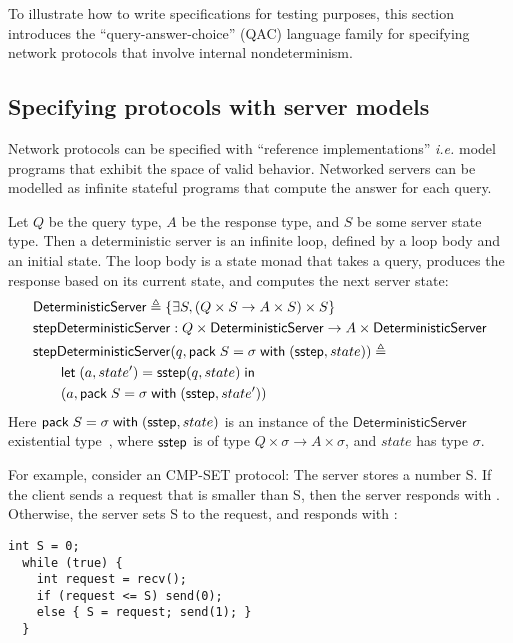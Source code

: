 To illustrate how to write specifications for testing purposes, this section
introduces the ``query-answer-choice'' (QAC) language family for specifying
network protocols that involve internal nondeterminism.

\subsection{Specifying protocols with server models}
Network protocols can be specified with ``reference implementations'' {\it i.e.}
model programs that exhibit the space of valid behavior.  Networked servers can
be modelled as infinite stateful programs that compute the answer for each
query.
\begin{definition}
Let $Q$ be the query type, $A$ be the response type, and $S$ be some server
state type.  Then a deterministic server is an infinite loop, defined by a loop
body and an initial state.  The loop body is a state monad that takes a query,
produces the response based on its current state, and computes the next server
state:
\begin{align*}
  &\mathsf{DeterministicServer}\triangleq\{\exists S,(Q \times S \to A \times S) \times S\} \\
  &\mathsf{stepDeterministicServer}:Q\times \mathsf{DeterministicServer} \to A\times \mathsf{DeterministicServer} \\
  &\mathsf{stepDeterministicServer}(q,\mathsf{pack}\;S=\sigma\;\mathsf{with}\;(\mathsf{sstep}, state))\triangleq\\
  &\qquad\mathsf{let}\;(a,state')=\mathsf{sstep}(q,state)\;\mathsf{in}\; \\
  &\qquad(a, \mathsf{pack}\;S=\sigma\;\mathsf{with}\;(\mathsf{sstep}, state'))
\end{align*}
Here $\mathsf{pack}\;S=\sigma\;\mathsf{with}\;(\mathsf{sstep}, state)$ is an instance of the
$\mathsf{DeterministicServer}$ existential type~\cite{tapl}, where $\mathsf{sstep}$ is
of type $Q\times\sigma\to A\times\sigma$, and $state$ has type $\sigma$.
\end{definition}

For example, consider an CMP-SET protocol: The server stores a number
\inlinec S.  If the client sends a request that is smaller than
\inlinec S, then the server responds with .  Otherwise, the
server sets \inlinec S to the request, and responds with :
\begin{lstlisting}[style=customc]
  int S = 0;
  while (true) {
    int request = recv();
    if (request <= S) send(0);
    else { S = request; send(1); }
  }
\end{lstlisting}

